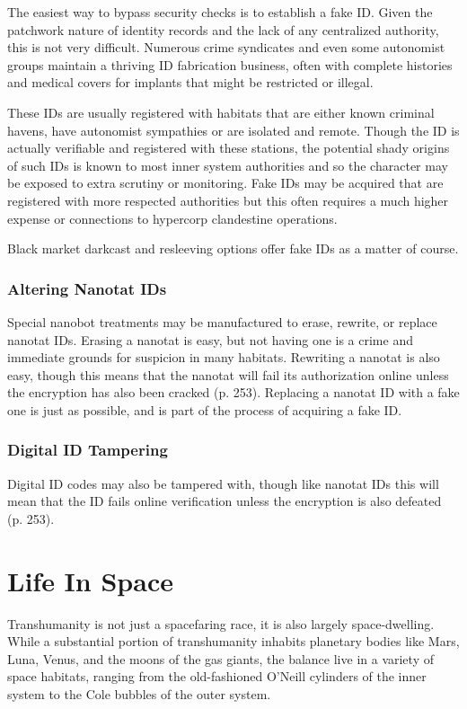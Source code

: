 The easiest way to bypass security checks is to establish a fake ID. Given the patchwork nature of identity records and the lack of any centralized authority, this is not very difficult. Numerous crime syndicates and even some autonomist groups maintain a thriving ID fabrication business, often with complete histories and medical covers for implants that might be restricted or illegal. 

These IDs are usually registered with habitats that are either known criminal havens, have autonomist sympathies or are isolated and remote. Though the ID is actually verifiable and registered with these stations, the potential shady origins of such IDs is known to most inner system authorities and so the character may be exposed to extra scrutiny or monitoring. Fake IDs may be acquired that are registered with more respected authorities but this often requires a much higher expense or connections to hypercorp clandestine operations. 

Black market darkcast and resleeving options offer fake IDs as a matter of course. 

\subsubsection{Altering Nanotat IDs} 

Special nanobot treatments may be manufactured to erase, rewrite, or replace nanotat IDs. Erasing a nanotat is easy, but not having one is a crime and immediate grounds for suspicion in many habitats. Rewriting a nanotat is also easy, though this means that the nanotat will fail its authorization online unless the encryption has also been cracked (p. 253). Replacing a nanotat ID with a fake one is just as possible, and is part of the process of acquiring a fake ID. 

\subsubsection{Digital ID Tampering} 

Digital ID codes may also be tampered with, though like nanotat IDs this will mean that the ID fails online verification unless the encryption is also defeated (p. 253). 

\section{Life In Space} 

Transhumanity is not just a spacefaring race, it is also largely space-dwelling. While a substantial portion of transhumanity inhabits planetary bodies like Mars, Luna, Venus, and the moons of the gas giants, the balance live in a variety of space habitats, ranging from the old-fashioned O'Neill cylinders of the inner system to the Cole bubbles of the outer system. 

